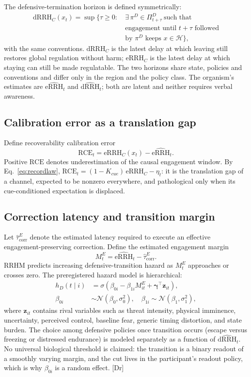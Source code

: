 \documentclass[9pt,twocolumn]{article}
\newcommand{\eRRHc}{\mathrm{eRRH}_{C}}
\newcommand{\dRRHc}{\mathrm{dRRH}_{C}}
\newcommand{\eRRHhat}{\widehat{\mathrm{eRRH}}}
\newcommand{\dRRHhat}{\widehat{\mathrm{dRRH}}}
\newcommand{\RCE}{\mathrm{RCE}}
\newcommand{\tcorr}{\widehat{\tau}^{E}_{\mathrm{corr}}}
\newcommand{\tier}[1]{{\sffamily\scriptsize\color{RRHMSlate}[#1]}}
\newcommand{\Hset}{\mathcal{H}}
\begin{document}
The defensive-termination horizon is defined symmetrically:
\begin{equation}
\begin{aligned}
\dRRHc(x_t)=\sup\Big\{\tau\ge0:\ &\exists\,\pi^D\in\Pi^D_{t+\tau}\ \text{such that}\\[-0.15em]
&\text{engagement until }t+\tau\text{ followed}\\[-0.15em]
&\text{by }\pi^D\text{ keeps }x\in\Hset\Big\},
\end{aligned}
\label{eq:drrhc}
\end{equation}
with the same conventions. $\dRRHc$ is the latest delay at which leaving still restores global regulation without harm; $\eRRHc$ is the latest delay at which staying can still be made regulatable. The two horizons share state, policies and conventions and differ only in the region and the policy class. The organism's estimates are $\eRRHhat_t$ and $\dRRHhat_t$; both are latent and neither requires verbal awareness.

\subsection{Calibration error as a translation gap}
Define recoverability calibration error
\[
\RCE_t=\eRRHc(x_t)-\eRRHhat_t .
\]
Positive $\RCE$ denotes underestimation of the causal engagement window. By Eq.~\ref{eq:recordlaw}, $\RCE_t=(1-K_{cue})\,\eRRHc-\eta_t$: it is the translation gap of a channel, expected to be nonzero everywhere, and pathological only when its cue-conditioned expectation is displaced.

\subsection{Correction latency and transition margin}
Let $\tcorr$ denote the estimated latency required to execute an effective engagement-preserving correction. Define the estimated engagement margin
\[
M_t^E=\eRRHhat_t-\tcorr .
\]
RRHM predicts increasing defensive-transition hazard as $M_t^E$ approaches or crosses zero. The preregistered hazard model is hierarchical:
\begin{equation}
\begin{aligned}
h_D(t\mid i)&=\sigma\!\left(\beta_{0i}-\beta_{1i}M_{it}^E+\boldsymbol\gamma^{\top}\mathbf z_{it}\right),\\[-0.1em]
\beta_{0i}&\sim\mathcal N(\beta_0,\sigma_0^2),\quad \beta_{1i}\sim\mathcal N(\beta_1,\sigma_1^2),
\end{aligned}
\label{eq:hazard}
\end{equation}
where $\mathbf z_{it}$ contains rival variables such as threat intensity, physical imminence, uncertainty, perceived control, baseline fear, generic timing distortion, and state burden. The choice among defensive policies once transition occurs (escape versus freezing or distressed endurance) is modeled separately as a function of $\dRRHhat_t$. No universal biological threshold is claimed: the transition is a binary readout of a smoothly varying margin, and the cut lives in the participant's readout policy, which is why $\beta_{0i}$ is a random effect. \tier{Dr}
\end{document}

